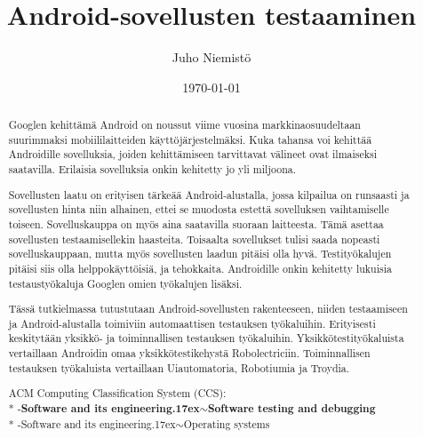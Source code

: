 \documentclass[emptyfirstpagenumber,gradu]{tktltiki}
\begin{document}
\sloppy
\lstset{language=Java}
\title{Android-sovellusten testaaminen}
\author{Juho Niemistö}
\date{\today}
\maketitle

\onehalfspacing

\subject{Tietojenkäsittelytiede}


\begin{abstract}
Googlen kehittämä Android on noussut viime vuosina markkinaosuudeltaan suurimmaksi mobiililaitteiden käyttöjärjestelmäksi. Kuka tahansa voi kehittää Androidille sovelluksia, joiden kehittämiseen tarvittavat välineet ovat ilmaiseksi saatavilla. Erilaisia sovelluksia onkin kehitetty jo yli miljoona.

Sovellusten laatu on erityisen tärkeää Android-alustalla, jossa kilpailua on runsaasti ja sovellusten hinta niin alhainen, ettei se muodosta estettä sovelluksen vaihtamiselle toiseen. Sovelluskauppa on myös aina saatavilla suoraan laitteesta. Tämä asettaa sovellusten testaamisellekin haasteita. Toisaalta sovellukset tulisi saada nopeasti sovelluskauppaan, mutta myös sovellusten laadun pitäisi olla hyvä. Testityökalujen pitäisi siis olla helppokäyttöisiä, ja tehokkaita. Androidille onkin kehitetty lukuisia testaustyökaluja Googlen omien työkalujen lisäksi.

Tässä tutkielmassa tutustutaan Android-sovellusten rakenteeseen, niiden testaamiseen ja Android-alustalla toimiviin automaattisen testauksen työkaluihin. Erityisesti keskitytään yksikkö- ja toiminnallisen testauksen työkaluihin. Yksikkötestityökaluista vertaillaan Androidin omaa yksikkötestikehystä Robolectriciin. Toiminnallisen testauksen työkaluista vertaillaan Uiautomatoria, Robotiumia ja Troydia.

ACM Computing Classification System (CCS):
\\* -\textbf{Software and its engineering{\raise.17ex\hbox{$\scriptstyle\mathtt{\sim}$}}Software testing and debugging}
\\* -Software and its engineering{\raise.17ex\hbox{$\scriptstyle\mathtt{\sim}$}}Operating systems
\end{abstract}
\setcounter{tocdepth}{3}
\mytableofcontents



\clearpage

\clearpage

\clearpage

\clearpage

\clearpage

\clearpage


\clearpage



\lastpage

\appendices


\lastappendixpage
\end{document}

